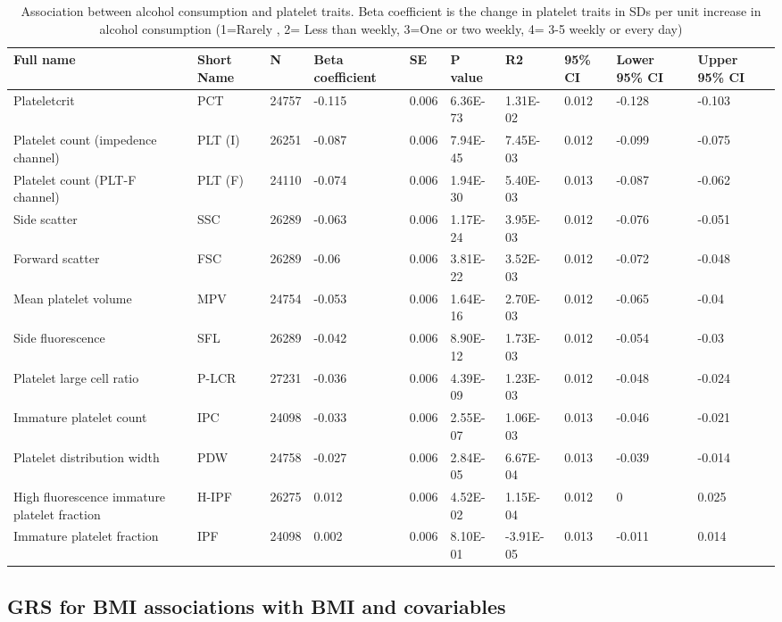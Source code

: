 \documentclass[11pt,twoside]{bristolthesis}
\begin{document}
\begin{landscape}\begin{table}

\caption[Association between alcohol consumption and platelet traits]{\label{tab:alcohol-platelets}Association between alcohol consumption and platelet traits. Beta coefficient is the change in platelet traits in SDs per unit increase in alcohol consumption (1=Rarely , 2= Less than weekly, 3=One or two weekly, 4= 3-5 weekly or every day) }
\centering
\begin{tabu} to 
\toprule
Full name & Short Name & N & Βeta coefficient & SE & P value & R2 & 95\% CI & Lower 95\% CI & Upper 95\% CI\\
\midrule
Plateletcrit & PCT & 24757 & -0.115 & 0.006 & 6.36E-73 & 1.31E-02 & 0.012 & -0.128 & -0.103\\
Platelet count (impedence channel) & PLT (I) & 26251 & -0.087 & 0.006 & 7.94E-45 & 7.45E-03 & 0.012 & -0.099 & -0.075\\
Platelet count (PLT-F channel) & PLT (F) & 24110 & -0.074 & 0.006 & 1.94E-30 & 5.40E-03 & 0.013 & -0.087 & -0.062\\
Side scatter & SSC & 26289 & -0.063 & 0.006 & 1.17E-24 & 3.95E-03 & 0.012 & -0.076 & -0.051\\
Forward scatter & FSC & 26289 & -0.06 & 0.006 & 3.81E-22 & 3.52E-03 & 0.012 & -0.072 & -0.048\\
\addlinespace
Mean platelet volume & MPV & 24754 & -0.053 & 0.006 & 1.64E-16 & 2.70E-03 & 0.012 & -0.065 & -0.04\\
Side fluorescence & SFL & 26289 & -0.042 & 0.006 & 8.90E-12 & 1.73E-03 & 0.012 & -0.054 & -0.03\\
Platelet large cell ratio & P-LCR & 27231 & -0.036 & 0.006 & 4.39E-09 & 1.23E-03 & 0.012 & -0.048 & -0.024\\
Immature platelet count & IPC & 24098 & -0.033 & 0.006 & 2.55E-07 & 1.06E-03 & 0.013 & -0.046 & -0.021\\
Platelet distribution width & PDW & 24758 & -0.027 & 0.006 & 2.84E-05 & 6.67E-04 & 0.013 & -0.039 & -0.014\\
\addlinespace
High fluorescence immature platelet fraction & H-IPF & 26275 & 0.012 & 0.006 & 4.52E-02 & 1.15E-04 & 0.012 & 0 & 0.025\\
Immature platelet fraction & IPF & 24098 & 0.002 & 0.006 & 8.10E-01 & -3.91E-05 & 0.013 & -0.011 & 0.014\\
\bottomrule
\end{tabu}
\end{table}
\end{landscape}
\hypertarget{grs-for-bmi-associations-with-bmi-and-covariables}{%
\subsection{GRS for BMI associations with BMI and covariables}\label{grs-for-bmi-associations-with-bmi-and-covariables}}
\end{document}
